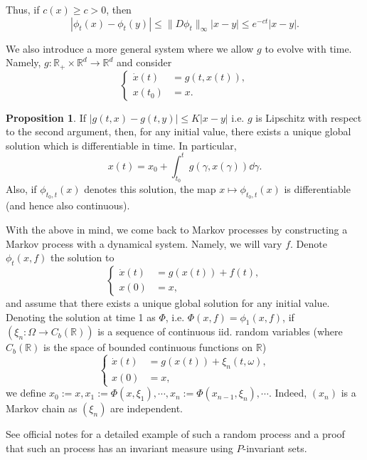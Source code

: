 \documentclass[]{article}
\theoremstyle{definition}
\theoremstyle{definition}
\newtheorem{proposition}{Proposition}[section]
\begin{document}
Thus, if \(c(x) \ge c > 0\), then 
\[|\phi_t(x) - \phi_t(y)| \le \|D\phi_t\|_\infty |x - y| \le e^{-ct}|x - y|.\]

We also introduce a more general system where we allow \(g\) to evolve with 
time. Namely, \(g : \mathbb{R}_+ \times \mathbb{R}^d \to \mathbb{R}^d\) 
and consider 
\[\begin{cases}
  \dot x(t) & = g(t, x(t)),\\
  x(t_0) & = x.
\end{cases}\]

\begin{proposition}
  If \(|g(t, x) - g(t, y)| \le K|x - y|\) i.e. \(g\) is Lipschitz with respect to 
  the second argument, then, for any initial value, there exists a unique 
  global solution which is differentiable in time. In particular, 
  \[x(t) = x_0 + \int_{t_0}^t g(\gamma, x(\gamma)) \dd \gamma.\]
  Also, if \(\phi_{t_0, t}(x)\) denotes this solution, the map 
  \(x \mapsto \phi_{t_0, t}(x)\) is differentiable (and hence also continuous).
\end{proposition}

With the above in mind, we come back to Markov processes by constructing a 
Markov process with a dynamical system. Namely, we will vary \(f\). 
Denote \(\phi_t(x, f)\) the solution to 
\[\begin{cases}
  \dot x(t) & = g(x(t)) + f(t),\\
  x(0) & = x,
\end{cases}\]
and assume that there exists a unique global solution for any initial value. 
Denoting the solution at time 1 as \(\Phi\), i.e. \(\Phi(x, f) = \phi_1(x, f)\), 
if \((\xi_n : \Omega \to C_b(\mathbb{R}))\) is a sequence of continuous iid. 
random variables (where \(C_b(\mathbb{R})\) is the space of bounded continuous 
functions on \(\mathbb{R}\))
\[\begin{cases}
  \dot x(t) & = g(x(t)) + \xi_n(t, \omega),\\
  x(0) & = x,
\end{cases}\]
we define \(x_0 := x, x_1 := \Phi(x, \xi_1), \cdots, x_n := \Phi(x_{n - 1}, \xi_n), \cdots\).
Indeed, \((x_n)\) is a Markov chain as \((\xi_n)\) are independent.

See official notes for a detailed example of such a random process and a proof 
that such an process has an invariant measure using \(P\)-invariant sets.
\end{document}
